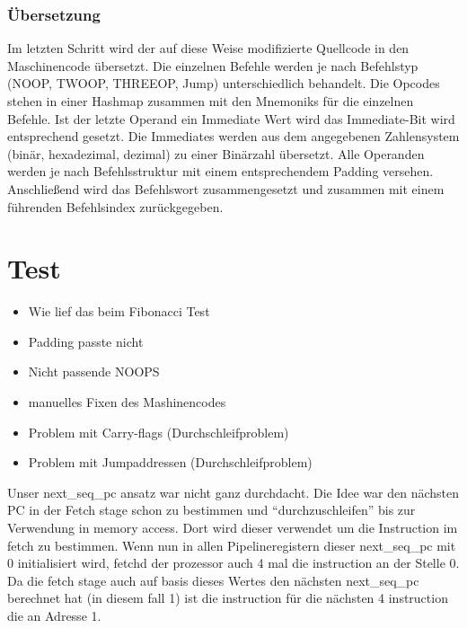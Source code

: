 \documentclass[paper=a4,fontsize=12pt,twocolumn]{scrreprt}
\begin{document}
\subsection{Übersetzung}
Im letzten Schritt wird der auf diese Weise modifizierte Quellcode in den Maschinencode übersetzt.
Die einzelnen Befehle werden je nach Befehlstyp (NOOP, TWOOP, THREEOP, Jump) unterschiedlich behandelt.
Die Opcodes stehen in einer Hashmap zusammen mit den Mnemoniks für die einzelnen Befehle.
Ist der letzte Operand ein Immediate Wert wird das Immediate-Bit wird entsprechend gesetzt.
Die Immediates werden aus dem angegebenen Zahlensystem (binär, hexadezimal, dezimal) zu einer Binärzahl übersetzt.
Alle Operanden werden je nach Befehlsstruktur mit einem entsprechendem Padding versehen.
Anschließend wird das Befehlswort zusammengesetzt und zusammen mit einem führenden Befehlsindex zurückgegeben.


\chapter{Test}
\begin{itemize}
    \item Wie lief das beim Fibonacci Test
    \item Padding passte nicht
    \item Nicht passende NOOPS
    \item manuelles Fixen des Mashinencodes
    \item Problem mit Carry-flags (Durchschleifproblem)
    \item Problem mit Jumpaddressen (Durchschleifproblem)
\end{itemize}

Unser next\_seq\_pc ansatz war nicht ganz durchdacht.
Die Idee war den nächsten PC in der Fetch stage schon zu bestimmen und \enquote{durchzuschleifen} bis zur Verwendung in memory access.
Dort wird dieser verwendet um die Instruction im fetch zu bestimmen.
Wenn nun in allen Pipelineregistern dieser next\_seq\_pc mit 0 initialisiert wird, fetchd der prozessor auch 4 mal die instruction an der Stelle 0.
Da die fetch stage auch auf basis dieses Wertes den nächsten next\_seq\_pc berechnet hat (in diesem fall 1) ist die instruction für die nächsten 4 instruction die an Adresse 1.
\end{document}
